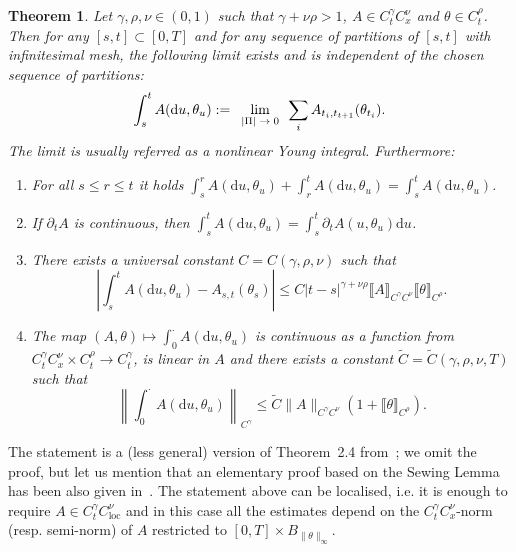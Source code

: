 \documentclass[10pt]{article}
\newcommand{\assign}{:=}
\newcommand{\mathd}{\mathrm{d}}
\newcommand{\tmcolor}[2]{{\color{#1}{#2}}}
\newcommand{\tmop}[1]{\ensuremath{\operatorname{#1}}}
\newcommand{\tmscript}[1]{\text{\scriptsize{$#1$}}}
\newenvironment{enumeratenumeric}{\begin{enumerate}[1.] }{\end{enumerate}}
\newtheorem{theorem}{Theorem}
\begin{document}
\begin{theorem}
  \label{sec4.1 thm definition young integral}Let $\gamma, \rho, \nu \in (0,
  1)$ such that $\gamma + \nu \rho > 1$, $A \in C^{\gamma}_t C^{\nu}_x$ and
  $\theta \in C^{\rho}_t$. Then for any $[s, t] \subset [0, T]$ and for any
  sequence of partitions of $[s, t]$ with infinitesimal mesh, the following
  limit exists and is independent of the chosen sequence of partitions:
  \[ \int_s^t A (\mathd u, \theta_u) \assign
     \tmcolor{blue}{\tmcolor{black}{\lim_{\tmscript{\begin{array}{c}
       | \Pi | \rightarrow 0
     \end{array}}}}} \sum_i A_{t_i, t_{t + 1}} (\theta_{t_i}) . \]
  The limit is usually referred as a nonlinear Young integral. Furthermore:
  \begin{enumeratenumeric}
    \item For all $s \leqslant r \leqslant t$ it holds $\int_s^r A (\mathd u,
    \theta_u) + \int_r^t A (\mathd u, \theta_u) = \int_s^t A (\mathd u,
    \theta_u)$.
    
    \item If $\partial_t A$ is continuous, then $\int_s^t A (\mathd u,
    \theta_u) = \int_s^t \partial_t A (u, \theta_u) \mathd u$.
    
    \item There exists a universal constant $C = C (\gamma, \rho, \nu)$ such
    that
    \[ \left| \int_s^t A (\mathd u, \theta_u) - A_{s, t} (\theta_s) \right|
       \leqslant C | t - s |^{\gamma + \nu \rho} \llbracket A
       \rrbracket_{C^{\gamma} C^{\nu}} \llbracket \theta \rrbracket_{C^{\rho}}
       . \]
    \item The map $(A, \theta) \mapsto \int_0^{\cdot} A (\mathd u, \theta_u)$
    is continuous as a function from $C^{\gamma}_t C^{\nu}_x \times C^{\rho}_t
    \rightarrow C^{\gamma}_t$, is linear in $A$ and there exists a constant
    $\tilde{C} = \tilde{C} (\gamma, \rho, \nu, T)$ such that
    \[ \left\| \int_0^{\cdot} A (\mathd u, \theta_u) \right\|_{C^{\gamma}}
       \leqslant \tilde{C}  \| A \|_{C^{\gamma} C^{\nu}}  (1 + \llbracket
       \theta \rrbracket_{C^{\rho}}) . \]
  \end{enumeratenumeric}
\end{theorem}

The statement is a (less general) version of Theorem~2.4
from~{\cite{catelliergubinelli}}; we omit the proof, but let us mention that
an elementary proof based on the Sewing Lemma has been also given
in~{\cite{hu}}. The statement above can be localised, i.e. it is enough to
require $A \in C^{\gamma}_t C^{\nu}_{\tmop{loc}}$ and in this case all the
estimates depend on the $C^{\gamma}_t C^{\nu}_x$\mbox{-}norm (resp. semi-norm)
of $A$ restricted to $[0, T] \times B_{\| \theta \|_{\infty}}$.
\end{document}
